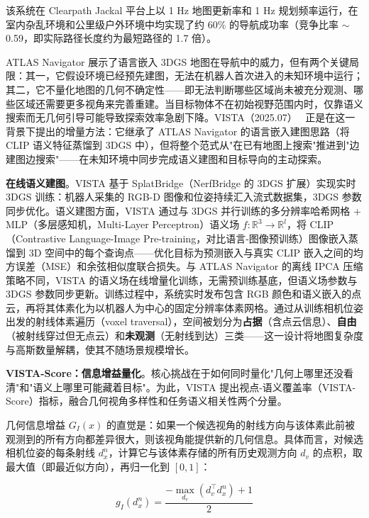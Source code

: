 该系统在 Clearpath Jackal 平台上以 1 Hz 地图更新率和 1 Hz 规划频率运行，在室内杂乱环境和公里级户外环境中均实现了约 60\% 的导航成功率（竞争比率 $\sim$0.59，即实际路径长度约为最短路径的 1.7 倍）。

ATLAS Navigator 展示了语言嵌入 3DGS 地图在导航中的威力，但有两个关键局限：其一，它假设环境已经预先建图，无法在机器人首次进入的未知环境中运行；其二，它不量化地图的几何不确定性——即无法判断哪些区域尚未被充分观测、哪些区域还需要更多视角来完善重建。当目标物体不在初始视野范围内时，仅靠语义搜索而无几何引导可能导致探索效率急剧下降。VISTA（2025.07）~\cite{2507_01125} 正是在这一背景下提出的增量方法：它继承了 ATLAS Navigator 的语言嵌入建图思路（将 CLIP 语义特征蒸馏到 3DGS 中），但将整个范式从"在已有地图上搜索"推进到"边建图边搜索"——在未知环境中同步完成语义建图和目标导向的主动探索。

\textbf{在线语义建图}。VISTA 基于 SplatBridge（NerfBridge 的 3DGS 扩展）实现实时 3DGS 训练：机器人采集的 RGB-D 图像和位姿持续汇入流式数据集，3DGS 参数同步优化。语义建图方面，VISTA 通过与 3DGS 并行训练的多分辨率哈希网格 + MLP（多层感知机，Multi-Layer Perceptron）语义场 $f: \mathbb{R}^3 \to \mathbb{R}^l$，将 CLIP（Contrastive Language-Image Pre-training，对比语言-图像预训练）图像嵌入蒸馏到 3D 空间中的每个查询点——优化目标为预测嵌入与真实 CLIP 嵌入之间的均方误差（MSE）和余弦相似度联合损失。与 ATLAS Navigator 的离线 IPCA 压缩策略不同，VISTA 的语义场在线增量化训练，无需预训练基底，但语义场参数与 3DGS 参数同步更新。训练过程中，系统实时发布包含 RGB 颜色和语义嵌入的点云，再将其体素化为以机器人为中心的固定分辨率体素网格。通过从训练相机位姿出发的射线体素遍历（voxel traversal），空间被划分为\textbf{占据}（含点云信息）、\textbf{自由}（被射线穿过但无点云）和\textbf{未观测}（无射线到达）三类——这一设计将地图复杂度与高斯数量解耦，使其不随场景规模增长。

\textbf{VISTA-Score：信息增益量化}。核心挑战在于如何同时量化"几何上哪里还没看清"和"语义上哪里可能藏着目标"。为此，VISTA 提出视点-语义覆盖率（VISTA-Score）指标，融合几何视角多样性和任务语义相关性两个分量。

几何信息增益 $G_I(x)$ 的直觉是：如果一个候选视角的射线方向与该体素此前被观测到的所有方向都差异很大，则该视角能提供新的几何信息。具体而言，对候选相机位姿的每条射线 $d_x^n$，计算它与该体素存储的所有历史观测方向 $d_v$ 的点积，取最大值（即最近似方向），再归一化到 $[0,1]$：

\begin{equation}
g_I(d_x^n) = \frac{-\max_{d_v}(d_v^\top d_x^n) + 1}{2}
\end{equation}

